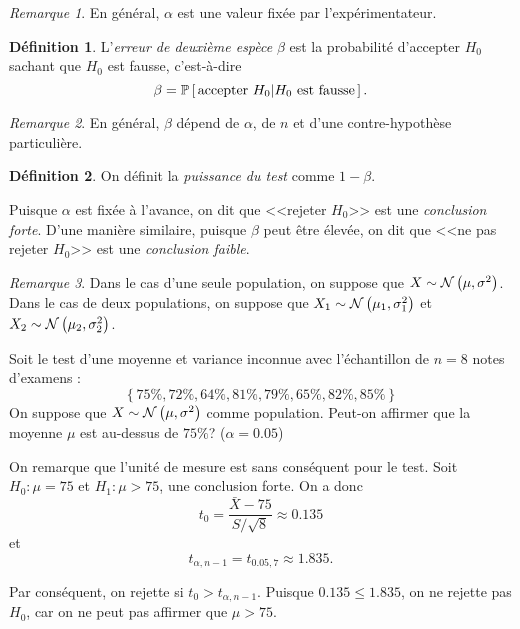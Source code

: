 \documentclass[11pt]{article}
\makeatletter
\newcommand\Pg[2]{%
	\ensuremath{%
		\mathbb{P}\left[\,#1\middle\rvert#2\,\right]%
	}%
}%
\newcommand\Norm[2]{%
	\ensuremath{%
		\mathcal{N}\left(#1,#2\right)%
	}%
}%
\theoremstyle{remark}
\newtheorem*{remark}{Remarque}
\theoremstyle{definition}
\newtheorem*{@definition}{Définition}
\newenvironment{definition}{%
	\begin{@definition}%
}{%
	\end{@definition}%
	\setcounter{property}{0}%
}
\makeatother
\begin{document}
\begin{remark}
	En général, $\alpha$ est une valeur fixée par l'expérimentateur.
\end{remark}

\begin{definition}
	L'\textit{erreur de deuxième espèce} $\beta$ est la probabilité d'accepter
	$H_0$ sachant que $H_0$ est fausse, c'est-à-dire
	\begin{equation*}
		\beta=\Pg{\text{accepter $H_0$}}{\text{$H_0$ est fausse}}.
	\end{equation*}
\end{definition}

\begin{remark}
	En général, $\beta$ dépend de $\alpha$, de $n$ et d'une contre-hypothèse
	particulière.
\end{remark}

\begin{definition}
	On définit la \textit{puissance du test} comme $1-\beta$.
\end{definition}

Puisque $\alpha$ est fixée à l'avance, on dit que <<rejeter $H_0$>> est une
\textit{conclusion forte}. D'une manière similaire, puisque $\beta$ peut être
élevée, on dit que <<ne pas rejeter $H_0$>> est une \textit{conclusion faible}.

\begin{remark}
	Dans le cas d'une seule population, on suppose que $X\sim\Norm{\mu}
	{\sigma^2}$. Dans le cas de deux populations, on suppose que $X_1\sim\Norm
	{\mu_1}{\sigma_1^2}$ et $X_2\sim\Norm{\mu_2}{\sigma_2^2}$.
\end{remark}

\begin{exemple}
	Soit le test d'une moyenne et variance inconnue avec l'échantillon de $n=8$
	notes d'examens :
	\begin{equation*}
		\left\{75\%,72\%,64\%,81\%,79\%,65\%,82\%,85\%\right\}
	\end{equation*}
	On suppose que $X\sim\Norm{\mu}{\sigma^2}$ comme population. Peut-on
	affirmer que la moyenne $\mu$ est au-dessus de $75\%$? ($\alpha=0.05$)

	On remarque que l'unité de mesure est sans conséquent pour le test. Soit
	$H_0:\mu=75$ et $H_1:\mu>75$, une conclusion forte. On a donc
	\begin{equation*}
		t_0=\frac{\bar{X}-75}{S/\sqrt{8}}\approx 0.135
	\end{equation*}
	et
	\begin{equation*}
		t_{\alpha,n-1}=t_{0.05,7}\approx 1.835.
	\end{equation*}

	Par conséquent, on rejette si $t_0>t_{\alpha,n-1}$. Puisque
	$0.135\leq 1.835$, on ne rejette pas $H_0$, car on ne peut pas affirmer que
	$\mu>75$.
\end{exemple}
\end{document}
